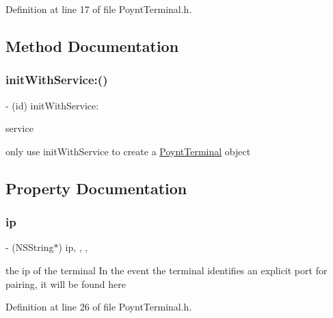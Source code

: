 Definition at line 17 of file Poynt\+Terminal.\+h.



\subsection{Method Documentation}
\hypertarget{interface_poynt_terminal_a85d039f4fe918b4ab91b90c1bac883f1}{}\label{interface_poynt_terminal_a85d039f4fe918b4ab91b90c1bac883f1} 
\subsubsection{\texorpdfstring{init\+With\+Service\+:()}{initWithService:()}}
{\footnotesize\ttfamily -\/ (id) init\+With\+Service\+: \begin{DoxyParamCaption}\item[{(N\+S\+Net\+Service $\ast$)}]{service }\end{DoxyParamCaption}}



only use init\+With\+Service to create a \hyperlink{interface_poynt_terminal}{Poynt\+Terminal} object 



\subsection{Property Documentation}
\hypertarget{interface_poynt_terminal_ab18eca4fc399814b2e86f54006b1e474}{}\label{interface_poynt_terminal_ab18eca4fc399814b2e86f54006b1e474} 
\subsubsection{\texorpdfstring{ip}{ip}}
{\footnotesize\ttfamily -\/ (N\+S\+String$\ast$) ip\hspace{0.3cm}{\ttfamily [read]}, {\ttfamily [write]}, {\ttfamily [nonatomic]}, {\ttfamily [strong]}}



the ip of the terminal  In the event the terminal identifies an explicit port for pairing, it will be found here 



Definition at line 26 of file Poynt\+Terminal.\+h.

